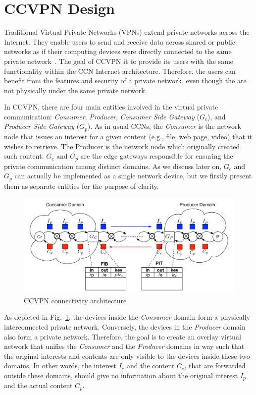 \section{CCVPN Design}\label{metho}

Traditional Virtual Private Networks (VPNs) extend private networks across the Internet. They enable users to send and receive data across shared or public networks as if their computing devices were directly connected to the same private network~\cite{khanvilkar2004virtual}. The goal of CCVPN it to provide its users with the same functionality within the CCN Internet architecture. Therefore, the users can benefit from the features and security of a private network, even though the are not physically under the same private network.

In CCVPN, there are four main entities involved in the virtual private communication: \textit{Consumer}, \textit{Producer}, \textit{Consumer Side Gateway} ($G_c$), and \textit{Producer Side Gateway} ($G_p$). As in usual CCNs, the \textit{Consumer} is the network node that issues an interest for a given content (e.g., file, web page, video) that it wishes to retrieve. The Producer is the network node which originally created such content. $G_c$ and $G_p$ are the edge gateways responsible for ensuring the private communication among distinct domains. As we discuss later on, $G_c$ and $G_p$ can actually be implemented as a single network device, but we firstly present them as separate entities for the purpose of clarity.

\begin{figure}
\centering
\includegraphics[width=\columnwidth]{images/architecture.pdf}
\caption{CCVPN connectivity architecture}
\label{fig:ccvpn}
\end{figure}

As depicted in Fig.~\ref{fig:ccvpn}, the devices inside the \textit{Consumer} domain form a physically interconnected private network. Conversely, the devices in the \textit{Producer} domain also form a private network. Therefore, the goal is to create an overlay virtual network that unifies the \textit{Consumer} and the \textit{Producer} domains in way such that the original interests and contents are only visible to the devices inside these two domains. In other words, the interest $I_e$ and the content $C_e$, that are forwarded outside these domains, should give no information about the original interest $I_p$ and the actual content $C_p$.

